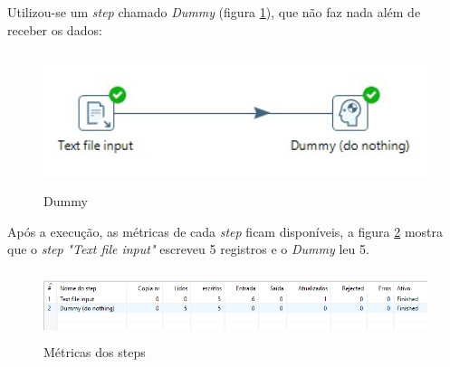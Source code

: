 Utilizou-se um \textit{step} chamado \textit{Dummy} (figura \ref{dummy}), que não faz nada além de receber os dados:
\begin{figure}[H]
\centering
\includegraphics[height=4cm]{imagens/example1.png}
\caption{Dummy}
\label{dummy}
\end{figure}
Após a execução, as métricas de cada \textit{step} ficam disponíveis, a figura \ref{metrics} mostra que o \textit{step} \textit{"Text file input" }escreveu 5 registros e o \textit{Dummy} leu 5.
\begin{figure}[H]
\centering
\includegraphics[height=2cm]{imagens/metrics.png}
\caption{Métricas dos steps}
\label{metrics}
\end{figure}
\vfill
